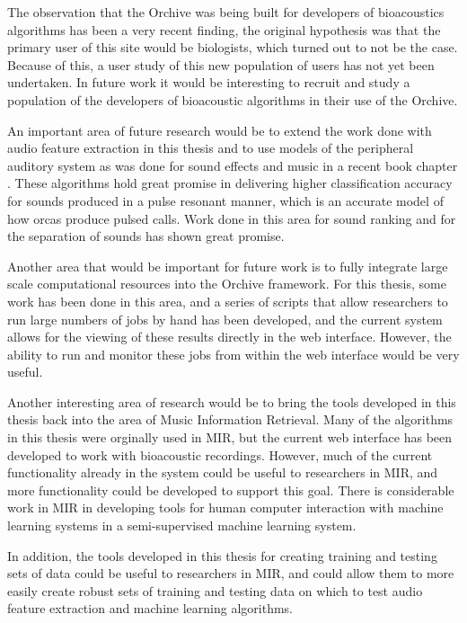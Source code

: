 The observation that the Orchive was being built for developers of
bioacoustics algorithms has been a very recent finding, the original
hypothesis was that the primary user of this site would be biologists,
which turned out to not be the case.  Because of this, a user study of
this new population of users has not yet been undertaken.  In future
work it would be interesting to recruit and study a population of the
developers of bioacoustic algorithms in their use of the Orchive.

An important area of future research would be to extend the work done
with audio feature extraction in this thesis and to use models of the
peripheral auditory system as was done for sound effects and music in
a recent book chapter \cite{ness2010sparse}.  These algorithms hold
great promise in delivering higher classification accuracy for sounds
produced in a pulse resonant manner, which is an accurate model of how
orcas produce pulsed calls.  Work done in this area for sound ranking
\cite{rehn2009sparse} and for the separation of sounds
\cite{duda1990correlograms} has shown great promise.

Another area that would be important for future work is to fully
integrate large scale computational resources into the Orchive
framework.  For this thesis, some work has been done in this area, and
a series of scripts that allow researchers to run large numbers of
jobs by hand has been developed, and the current system allows for the
viewing of these results directly in the web interface.  However, the
ability to run and monitor these jobs from within the web interface
would be very useful.  

Another interesting area of research would be to bring the tools
developed in this thesis back into the area of Music Information
Retrieval.  Many of the algorithms in this thesis were orginally used
in MIR, but the current web interface has been developed to work with
bioacoustic recordings.  However, much of the current functionality
already in the system could be useful to researchers in MIR, and more
functionality could be developed to support this goal.  There is
considerable work in MIR in developing tools for human computer
interaction with machine learning systems in a semi-supervised machine
learning system.  

In addition, the tools developed in this thesis for creating training
and testing sets of data could be useful to researchers in MIR, and
could allow them to more easily create robust sets of training and
testing data on which to test audio feature extraction and machine
learning algorithms.

